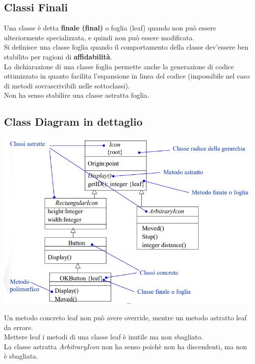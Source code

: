 \documentclass{article}
\begin{document}
	\subsection{Classi Finali}
	Una classe è detta \textbf{finale (final)} o foglia (leaf) quando non può essere ulteriormente specializzata, e quindi non può essere modificata. \\
	Si definisce una classe foglia quando il comportamento della classe dev'essere ben stabilito per ragioni di \textbf{affidabilità}. \\
	La dichiarazione di una classe foglia permette anche la generazione di codice ottimizzato in quanto facilita l'espansione in linea del codice (impossibile nel caso di metodi sovrascrivibili nelle sottoclassi). \\
	Non ha senso stabilire una classe astratta foglia. 

	\subsection{Class Diagram in dettaglio}
	\begin{center}
		\includegraphics[scale=0.5]{assets/class_diagram.png}
	\end{center}
	Un metodo concreto leaf non può avere override, mentre un metodo astratto leaf da errore. \\
	Mettere leaf i metodi di una classe leaf è inutile ma non sbagliato. \\
	La classe astratta \textit{ArbitraryIcon} non ha senso poichè non ha discendenti, ma non è sbagliata.
\end{document}
